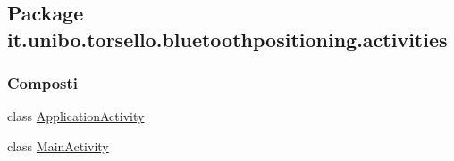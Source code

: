 \hypertarget{namespaceit_1_1unibo_1_1torsello_1_1bluetoothpositioning_1_1activities}{}\subsection{Package it.\+unibo.\+torsello.\+bluetoothpositioning.\+activities}
\label{namespaceit_1_1unibo_1_1torsello_1_1bluetoothpositioning_1_1activities}
\subsubsection*{Composti}
\begin{DoxyCompactItemize}
\item 
class \hyperlink{classit_1_1unibo_1_1torsello_1_1bluetoothpositioning_1_1activities_1_1ApplicationActivity}{Application\+Activity}
\item 
class \hyperlink{classit_1_1unibo_1_1torsello_1_1bluetoothpositioning_1_1activities_1_1MainActivity}{Main\+Activity}
\end{DoxyCompactItemize}
